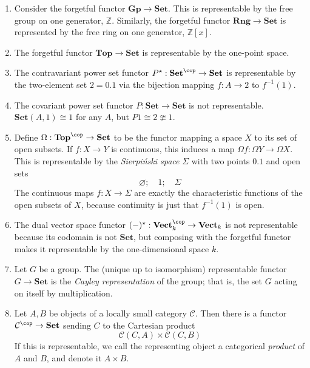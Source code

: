 \begin{enumerate}
    \item Consider the forgetful functor \( \mathbf{Gp} \to \mathbf{Set} \).
    This is representable by the free group on one generator, \( \mathbb Z \).
    Similarly, the forgetful functor \( \mathbf{Rng} \to \mathbf{Set} \) is represented by the free ring on one generator, \( \mathbb Z[x] \).
    \item The forgetful functor \( \mathbf{Top} \to \mathbf{Set} \) is representable by the one-point space.
    \item The contravariant power set functor \( P^\star : \mathbf{Set}^\cop \to \mathbf{Set} \) is representable by the two-element set \( 2 = \qty{0, 1} \) via the bijection mapping \( f : A \to 2 \) to \( f^{-1}(1) \).
    \item The covariant power set functor \( P : \mathbf{Set} \to \mathbf{Set} \) is not representable.
    \( \mathbf{Set}(A, 1) \cong 1 \) for any \( A \), but \( P 1 \cong 2 \ncong 1 \).
    \item Define \( \Omega : \mathbf{Top}^\cop \to \mathbf{Set} \) to be the functor mapping a space \( X \) to its set of open subsets.
    If \( f : X \to Y \) is continuous, this induces a map \( \Omega f : \Omega Y \to \Omega X \).
    This is representable by the \emph{Sierpi\'nski space} \( \Sigma \) with two points \( \qty{0, 1} \) and open sets
    \[ \varnothing;\quad \qty{1};\quad \Sigma \]
    The continuous maps \( f : X \to \Sigma \) are exactly the characteristic functions of the open subsets of \( X \), because continuity is just that \( f^{-1}(\qty{1}) \) is open.
    \item The dual vector space functor \( (-)^\star : \mathbf{Vect}_k^\cop \to \mathbf{Vect}_k \) is not representable because its codomain is not \( \mathbf{Set} \), but composing with the forgetful functor makes it representable by the one-dimensional space \( k \).
    \item Let \( G \) be a group.
    The (unique up to isomorphism) representable functor \( G \to \mathbf{Set} \) is the \emph{Cayley representation} of the group; that is, the set \( G \) acting on itself by multiplication.
    \item Let \( A, B \) be objects of a locally small category \( \mathcal C \).
    Then there is a functor \( \mathcal C^\cop \to \mathbf{Set} \) sending \( C \) to the Cartesian product
    \[ \mathcal C(C, A) \times \mathcal C(C, B) \]
    If this is representable, we call the representing object a categorical \emph{product} of \( A \) and \( B \), and denote it \( A \times B \).

\end{enumerate}
